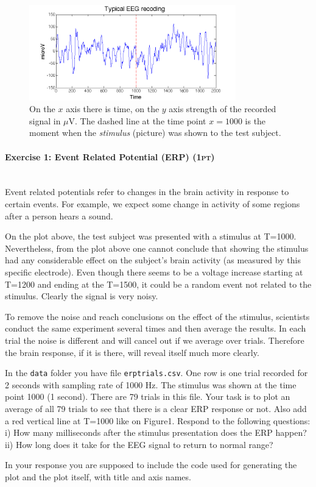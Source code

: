 \documentclass[a4paper,11pt]{article}
\newenvironment{exercise}[3]{\paragraph{Exercise #1: #2 \textsc{(#3pt)}}\ \\}{
\medskip}
\begin{document}
\begin{figure}[H]
   \centering
   \includegraphics[width=0.8\textwidth]{eegrecording.png} 
  \caption{On the $x$ axis there is time, on the $y$ axis strength of the recorded signal in $\mu$V. The dashed line at the time point $x=1000$ is the moment when the \emph{stimulus} (picture) was shown to the test subject.}
\end{figure}


%
%
\begin{exercise}{1}{Event Related Potential (ERP)}{1}
Event related potentials refer to changes in the brain activity in response to certain events. For example, we expect some change in activity of some regions after a person hears a sound.

On the plot above, the test subject was presented with a stimulus at T=1000. Nevertheless, from the plot above one cannot conclude that showing the stimulus had any considerable effect on the subject's brain activity (as measured by this specific electrode). Even though there seems to be a voltage increase starting at T=1200 and ending at the T=1500, it could be a random event not related to the stimulus. Clearly the signal is very noisy.

To remove the noise and reach conclusions on the effect of the stimulus, scientists conduct the same experiment several times and then average the results. In each trial the noise is different and will cancel out if we average over trials. Therefore the brain response, if it is there, will reveal itself much more clearly.

In the \texttt{data} folder you have file \texttt{erptrials.csv}. One row is one trial recorded for 2 seconds with sampling rate of 1000 Hz. The stimulus was shown at the time point 1000 (1 second). There are 79 trials in this file. Your task is to plot an average of all 79 trials to see that there is a clear ERP response or not. Also add a red vertical line at T=1000 like on Figure1. Respond to the following questions: i) How many milliseconds after the stimulus presentation does the ERP happen? ii) How long does it take for the EEG signal to return to normal range?

In your response you are supposed to include the code used for generating the plot and the plot itself, with title and axis names. 
\end{exercise}
\end{document}
